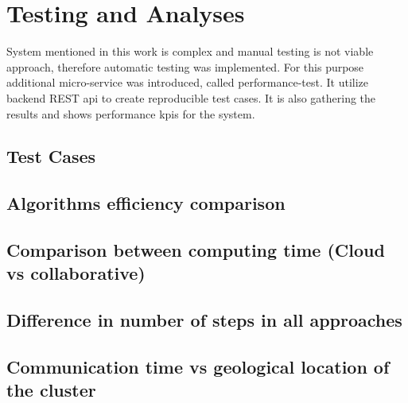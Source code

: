 \chapter{Testing and Analyses}
System mentioned in this work is complex and manual testing is not viable approach, therefore automatic testing was implemented. For this purpose additional micro-service was introduced, called performance-test. It utilize backend REST api to create reproducible test cases. It is also gathering the results and shows performance kpis for the system.

\section{Test Cases}


\section{Algorithms efficiency comparison}


\section{Comparison between computing time (Cloud vs collaborative)}


\section{Difference in number of steps in all approaches}


\section{Communication time vs geological location of the cluster}
